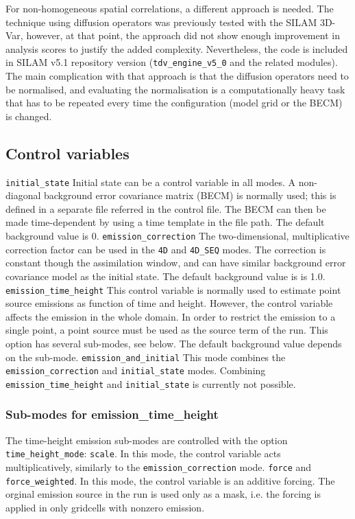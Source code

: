 \documentclass[a4paper]{article}
\begin{document}
For non-homogeneous spatial correlations, a different approach is needed. The technique
using diffusion operators \citep{Weaver2001} was previously tested with the SILAM 3D-Var,
however, at that point, the approach did not show enough improvement in analysis scores to
justify the added complexity. Nevertheless, the code is included in SILAM v5.1 repository
version (\verb|tdv_engine_v5_0| and the related modules). The main complication with that
approach is that the diffusion operators need to be normalised, and evaluating the
normalisation is a computationally heavy task that has to be repeated every time the
configuration (model grid or the BECM) is changed.

\subsection{Control variables}

\verb|initial_state| Initial state can be a control variable in all modes. A
non-diagonal background error covariance matrix (BECM) is normally used; this is defined
in a separate file referred in the control file. The BECM can then be made time-dependent
by using a time template in the file path. The default background value is 0.
\verb|emission_correction| The two-dimensional, multiplicative correction
factor can be used in the \verb|4D| and \verb|4D_SEQ| modes. The correction is constant
though the assimilation window, and can have similar background error covariance model as
the initial state. The default background value is is 1.0.
\verb|emission_time_height| This control variable is normally used to estimate
point source emissions as function of time and height. However, the control variable
affects the emission in the whole domain. In order to restrict the emission to a single
point, a point source must be used as the source term of the run. This option has several
sub-modes, see below. The default background value depends on the sub-mode.
\verb|emission_and_initial| This mode combines the \verb|emission_correction|
and \verb|initial_state| modes. Combining \verb|emission_time_height| and
\verb|initial_state| is currently not possible.

\subsubsection{Sub-modes for emission\_time\_height}

The time-height emission sub-modes are controlled with the option
\verb|time_height_mode|:
\verb|scale|. In this mode, the control variable acts multiplicatively,
similarly to the \verb|emission_correction| mode.
\verb|force| and \verb|force_weighted|. In this mode, the control variable is
an additive forcing. The orginal emission source in the run is used only as a mask,
i.e. the forcing is applied in only gridcells with nonzero emission. 
\end{document}
